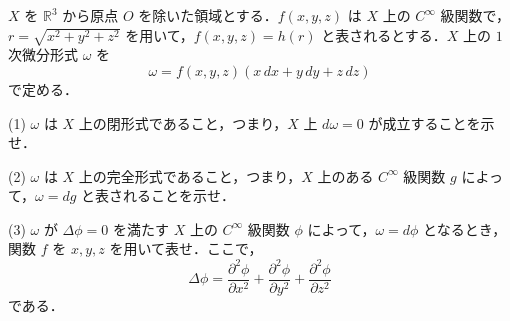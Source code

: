 \documentclass[12pt]{jlreq}
\newcommand{\R}{\mathbb{R}}
\begin{document}
\(X\) を \(\R^3\) から原点 \(O\) を除いた領域とする．\(f(x, y, z)\) は \(X\) 上の \(C^\infty\) 級関数で，\(r = \sqrt{x^2+y^2+z^2}\) を用いて，\(f(x, y, z) = h(r)\) と表されるとする．\(X\) 上の \(1\) 次微分形式 \(\omega\) を
\[
  \omega = f(x, y, z) (x \, dx + y \, dy + z \, dz)
\]
で定める．

(1) \(\omega\) は \(X\) 上の閉形式であること，つまり，\(X\) 上 \(d\omega = 0\) が成立することを示せ．

(2) \(\omega\) は \(X\) 上の完全形式であること，つまり，\(X\) 上のある \(C^\infty\) 級関数 \(g\) によって，\(\omega = dg\) と表されることを示せ．

(3) \(\omega\) が \(\Delta \phi = 0\) を満たす \(X\) 上の \(C^\infty\) 級関数 \(\phi\) によって，\(\omega = d\phi\) となるとき，関数 \(f\) を \(x, y, z\) を用いて表せ．ここで，
\[
  \Delta \phi = \frac{\partial^2 \phi}{\partial x^2} + \frac{\partial^2 \phi}{\partial y^2} + \frac{\partial^2 \phi}{\partial z^2}
\]
である．
\end{document}
